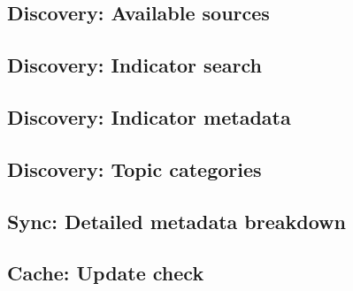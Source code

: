 \documentclass[bib]{statapress}
\begin{document}
\subsection{Discovery: Available sources}\label{app:diagnostics:sources}
\begin{stlog}
\nullskip
\end{stlog}

\subsection{Discovery: Indicator search}\label{app:diagnostics:search}
\begin{stlog}
\nullskip
\end{stlog}

\subsection{Discovery: Indicator metadata}\label{app:diagnostics:info}
\begin{stlog}
\nullskip
\end{stlog}

\subsection{Discovery: Topic categories}\label{app:diagnostics:alltopics}
\begin{stlog}
\nullskip
\end{stlog}

\subsection{Sync: Detailed metadata breakdown}\label{app:diagnostics:sync}
\begin{stlog}
\nullskip
\end{stlog}

\subsection{Cache: Update check}\label{app:diagnostics:checkupdate}
\begin{stlog}
\nullskip
\end{stlog}

\end{document}
